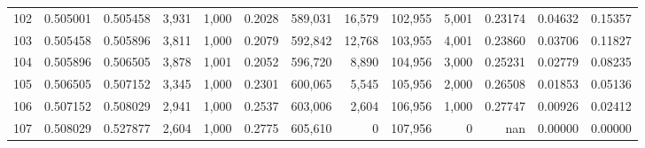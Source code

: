 \begin{tabular}{rrrrrrrrrrrrr}
102 &  0.505001 &  0.505458 &  3,931 &  1,000 &                                     0.2028 &  589,031 &   16,579 &  102,955 &    5,001 &  0.23174 &  0.04632 &  0.15357 \\
103 &  0.505458 &  0.505896 &  3,811 &  1,000 &                                     0.2079 &  592,842 &   12,768 &  103,955 &    4,001 &  0.23860 &  0.03706 &  0.11827 \\
104 &  0.505896 &  0.506505 &  3,878 &  1,001 &                                     0.2052 &  596,720 &    8,890 &  104,956 &    3,000 &  0.25231 &  0.02779 &  0.08235 \\
105 &  0.506505 &  0.507152 &  3,345 &  1,000 &                                     0.2301 &  600,065 &    5,545 &  105,956 &    2,000 &  0.26508 &  0.01853 &  0.05136 \\
106 &  0.507152 &  0.508029 &  2,941 &  1,000 &                                     0.2537 &  603,006 &    2,604 &  106,956 &    1,000 &  0.27747 &  0.00926 &  0.02412 \\
107 &  0.508029 &  0.527877 &  2,604 &  1,000 &                                     0.2775 &  605,610 &        0 &  107,956 &        0 &      nan &  0.00000 &  0.00000 \\
\bottomrule
\end{tabular}
